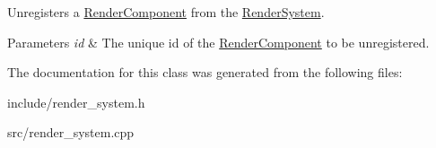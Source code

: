 Unregisters a \hyperlink{class_blade_1_1_render_component}{Render\+Component} from the \hyperlink{class_blade_1_1_render_system}{Render\+System}. 


\begin{DoxyParams}{Parameters}
{\em id} & The unique id of the \hyperlink{class_blade_1_1_render_component}{Render\+Component} to be unregistered. \\
\hline
\end{DoxyParams}


The documentation for this class was generated from the following files\+:\begin{DoxyCompactItemize}
\item 
include/render\+\_\+system.\+h\item 
src/render\+\_\+system.\+cpp\end{DoxyCompactItemize}
